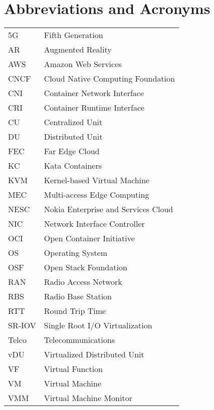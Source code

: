 \chapter*{Abbreviations and Acronyms}

\noindent
\begin{longtable}{@{}p{}p{}@{}}
5G & Fifth Generation \\
AR & Augmented Reality \\
AWS & Amazon Web Services \\
CNCF & Cloud Native Computing Foundation \\
CNI & Container Network Interface \\
CRI & Container Runtime Interface \\
CU & Centralized Unit \\
DU & Distributed Unit \\
FEC & Far Edge Cloud \\
KC & Kata Containers \\
KVM & Kernel-based Virtual Machine \\
MEC & Multi-access Edge Computing \\
NESC & Nokia Enterprise and Services Cloud \\
NIC & Network Interface Controller \\
OCI & Open Container Initiative \\
OS & Operating System \\
OSF & Open Stack Foundation \\
RAN & Radio Access Network \\
RBS & Radio Base Station \\
RTT & Round Trip Time \\
SR-IOV & Single Root I/O Virtualization \\
Telco & Telecommunications \\
vDU & Virtualized Distributed Unit \\
VF & Virtual Function \\
VM & Virtual Machine \\
VMM & Virtual Machine Monitor \\



\end{longtable}
